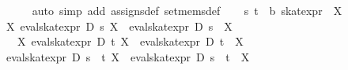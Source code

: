 \begin{isabellebody}
\ \ \ \ \isamarkupfalse%
\ {}auto\ simp\ add{}\ assigns{}def\ set{}mems{}def{}\isanewline
{}\isamarkupfalse%
\isanewline
\ \ \isamarkupfalse%
\ s\ t\ {}{}\ {}{}b\ skat{}expr{}\ \ X\isanewline
\ \ \isamarkupfalse%
\ {}{}X{}\ eval{}skat{}expr\ D\ s\ {}{}X{}\ {}\ {}eval{}skat{}expr\ D\ s\ {}\ X{}\isanewline
\ \ \ {}{}X{}\ eval{}skat{}expr\ D\ t\ {}{}X{}\ {}\ {}eval{}skat{}expr\ D\ t\ {}\ X{}\isanewline
\ \ \isamarkupfalse%
\ {}eval{}skat{}expr\ D\ {}s\ {}{}{}\ t{}\ {}{}X{}\ {}\ {}eval{}skat{}expr\ D\ {}s\ {}{}{}\ t{}\ {}\ X{}\isanewline

\end{isabellebody}
